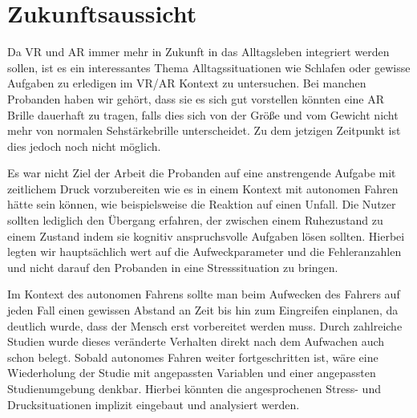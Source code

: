 \section{Zukunftsaussicht}


Da VR und AR immer mehr in Zukunft in das Alltagsleben integriert werden sollen, ist es ein interessantes Thema Alltagssituationen wie Schlafen oder gewisse Aufgaben zu erledigen im VR/AR Kontext zu untersuchen. Bei manchen Probanden haben wir gehört, dass sie es sich gut vorstellen könnten eine AR Brille dauerhaft zu tragen, falls dies sich von der Größe und vom Gewicht nicht mehr von normalen Sehstärkebrille unterscheidet. Zu dem jetzigen Zeitpunkt ist dies jedoch noch nicht möglich.

Es war nicht Ziel der Arbeit die Probanden auf eine anstrengende Aufgabe mit zeitlichem Druck vorzubereiten wie es in einem Kontext mit autonomen Fahren hätte sein können, wie beispielsweise die Reaktion auf einen Unfall. Die Nutzer sollten lediglich den Übergang erfahren, der zwischen einem Ruhezustand zu einem Zustand indem sie kognitiv anspruchsvolle Aufgaben lösen sollten. Hierbei legten wir hauptsächlich wert auf die Aufweckparameter und die Fehleranzahlen und nicht darauf den Probanden in eine Stresssituation zu bringen.

Im Kontext des autonomen Fahrens sollte man beim Aufwecken des Fahrers auf jeden Fall einen gewissen Abstand an Zeit bis hin zum Eingreifen einplanen, da deutlich wurde, dass der Mensch erst vorbereitet werden muss. Durch zahlreiche Studien wurde dieses veränderte Verhalten direkt nach dem Aufwachen auch schon belegt. Sobald autonomes Fahren weiter fortgeschritten ist, wäre eine Wiederholung der Studie mit angepassten Variablen und einer angepassten Studienumgebung denkbar. Hierbei könnten die angesprochenen Stress- und Drucksituationen implizit eingebaut und analysiert werden.
